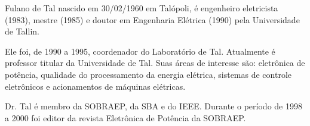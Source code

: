 \begin{biografia}{Fulano de Tal}
	nascido em 30/02/1960 em Talópoli, é engenheiro eletricista (1983), mestre (1985) e doutor em Engenharia Elétrica (1990) pela Universidade de Tallin.
	
	Ele foi, de 1990 a 1995, coordenador do Laboratório de Tal. Atualmente é professor titular da Universidade de Tal. Suas áreas de interesse são: eletrônica de potência, qualidade do processamento da energia elétrica, sistemas de controle eletrônicos e acionamentos de máquinas elétricas.
	
	Dr. Tal é membro da SOBRAEP, da SBA e do IEEE. Durante o período de 1998 a 2000 foi editor da revista Eletrônica de Potência da SOBRAEP.
\end{biografia}
